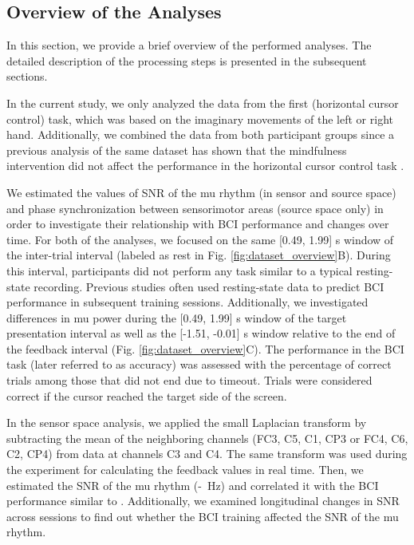 \subsection{Overview of the Analyses}

In this section, we provide a brief overview of the performed analyses. The detailed description of the processing steps is presented in the subsequent sections.

\medskip

In the current study, we only analyzed the data from the first (horizontal cursor control) task, which was based on the imaginary movements of the left or right hand. Additionally, we combined the data from both participant groups since a previous analysis of the same dataset has shown that the mindfulness intervention did not affect the performance in the horizontal cursor control task \citep{Stieger2020_analysis}.

\medskip

We estimated the values of SNR of the mu rhythm (in sensor and source space) and phase synchronization between sensorimotor areas (source space only) in order to investigate their relationship with BCI performance and changes over time. For both of the analyses, we focused on the same [0.49, 1.99] s window of the inter-trial interval (labeled as rest in Fig. \ref{fig:dataset_overview}B). During this interval, participants did not perform any task similar to a typical resting-state recording. Previous studies often used resting-state data to predict BCI performance in subsequent training sessions. Additionally, we investigated differences in mu power during the [0.49, 1.99] s window of the target presentation interval as well as the [-1.51, -0.01] s window relative to the end of the feedback interval (Fig. \ref{fig:dataset_overview}C). The performance in the BCI task (later referred to as accuracy) was assessed with the percentage of correct trials among those that did not end due to timeout. Trials were considered correct if the cursor reached the target side of the screen.

\medskip

In the sensor space analysis, we applied the small Laplacian transform by subtracting the mean of the neighboring channels (FC3, C5, C1, CP3 or FC4, C6, C2, CP4) from data at channels C3 and C4. The same transform was used during the experiment for calculating the feedback values in real time. Then, we estimated the SNR of the mu rhythm (\muLow-\muHigh~Hz) and correlated it with the BCI performance similar to \citep{Blankertz2010}. Additionally, we examined longitudinal changes in SNR across sessions to find out whether the BCI training affected the SNR of the mu rhythm.

